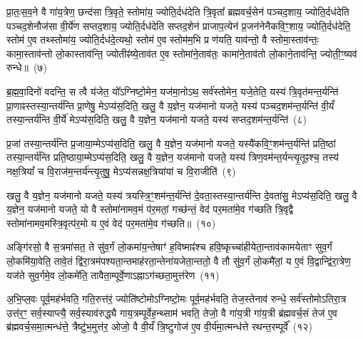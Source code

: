 {\anuvakamend[{अस्थू॑रि॒रोष॑धीषु ज्येष्ठय॒ज्ञ इति॑ बृ॒हद॑नु॒ष्टुप्छन्दः॒ प्रति॑ष्ठिता॒ नव॑ च}]}%

प्रा॒तः॒स॒व॒ने वै गा॑य॒त्रेण॒ छन्द॑सा त्रि॒वृते॒ स्तोमा॑य॒ ज्योति॒र्दध॑देति त्रि॒वृता᳚ ब्रह्मवर्च॒सेन॑ पञ्चद॒शाय॒ ज्योति॒र्दध॑देति पञ्चद॒शेनौज॑सा वी॒र्ये॑ण सप्तद॒शाय॒ ज्योति॒र्दध॑देति सप्तद॒शेन॑ प्राजाप॒त्येन॑ प्र॒जन॑नेनैकवि॒ꣳ॒शाय॒ ज्योति॒र्दध॑देति॒ स्तोम॑ ए॒व तथ्स्तोमा॑य॒ ज्योति॒र्दध॑दे॒त्यथो॒ स्तोम॑ ए॒व स्तोम॑म॒भि प्र ण॑यति॒ याव॑न्तो॒ वै स्तोमा॒स्ताव॑न्तः॒ कामा॒स्ताव॑न्तो लो॒कास्ताव॑न्ति॒ ज्योतीꣴ॑ष्ये॒ताव॑त ए॒व स्तोमा॑ने॒ताव॑तः॒ कामा॑ने॒ताव॑तो लो॒काने॒ताव॑न्ति॒ ज्योती॒ꣳ॒ष्यव॑ रुन्धे॥~(७)

{\anuvakamend[{ताव॑न्तो लो॒कास्त्रयो॑दश च}]}%

ब्र॒ह्म॒वा॒दिनो॑ वदन्ति॒ स त्वै य॑जेत॒ यो᳚\-ऽग्निष्टो॒मेन॒ यज॑मा॒नो\-ऽथ॒ सर्व॑स्तोमेन॒ यजे॒तेति॒ यस्य॑ त्रि॒वृत॑मन्त॒र्यन्ति॑ प्रा॒णाꣴस्तस्या॒न्तर्य॑न्ति प्रा॒णेषु॒ मे\-ऽप्य॑स॒दिति॒ खलु॒ वै य॒ज्ञेन॒ यज॑मानो यजते॒ यस्य॑ पञ्चद॒शम॑न्त॒र्यन्ति॑ वी॒र्यं॑ तस्या॒न्तर्य॑न्ति वी॒र्ये॑ मे\-ऽप्य॑स॒दिति॒ खलु॒ वै य॒ज्ञेन॒ यज॑मानो यजते॒ यस्य॑ सप्तद॒शम॑न्त॒र्यन्ति॑~(८)

प्र॒जां तस्या॒न्तर्य॑न्ति प्र॒जाया॒म्मे\-ऽप्य॑स॒दिति॒ खलु॒ वै य॒ज्ञेन॒ यज॑मानो यजते॒ यस्यै॑कवि॒ꣳ॒शम॑न्त॒र्यन्ति॑ प्रति॒ष्ठां तस्या॒न्तर्य॑न्ति प्रति॒ष्ठाया॒म्मे\-ऽप्य॑स॒दिति॒ खलु॒ वै य॒ज्ञेन॒ यज॑मानो यजते॒ यस्य॑ त्रिण॒वम॑न्त॒र्यन्त्यृ॒तूꣴश्च॒ तस्य॑ नक्ष॒त्रियां᳚ च वि॒राज॑म॒न्तर्य॑न्त्यृ॒तुषु॒ मे\-ऽप्य॑सन्नक्ष॒त्रिया॑यां च वि॒राजीति॑~(९)

खलु॒ वै य॒ज्ञेन॒ यज॑मानो यजते॒ यस्य॑ त्रयस्त्रि॒ꣳ॒शम॑न्त॒र्यन्ति॑ दे॒वता॒स्तस्या॒न्तर्य॑न्ति दे॒वता॑सु॒ मे\-ऽप्य॑स॒दिति॒ खलु॒ वै य॒ज्ञेन॒ यज॑मानो यजते॒ यो वै स्तोमा॑नामव॒मं प॑र॒मतां॒ गच्छ॑न्तं॒ वेद॑ पर॒मता॑मे॒व ग॑च्छति त्रि॒वृद्वै स्तोमा॑नामव॒म\-स्त्रि॒वृत्प॑र॒मो य ए॒वं वेद॑ पर॒मता॑मे॒व ग॑च्छति॥~(१०)

{\anuvakamend[{स॒प्त॒द॒शम॑न्त॒र्यन्ति॑ वि॒राजीति॒ चतु॑श्चत्वारिꣳशच्च}]}%

अङ्गि॑रसो॒ वै स॒त्रमा॑सत॒ ते सु॑व॒र्गं लो॒कमा॑य॒न्तेषाꣳ॑ ह॒विष्माꣴ॑श्च हवि॒ष्कृच्चा॑हीयेता॒न्ताव॑कामयेताꣳ सुव॒र्गं लो॒कमि॑या॒वेति॒ तावे॒तं द्वि॑रा॒त्रम॑पश्यता॒न्तमाह॑रता॒न्तेना॑यजेता॒न्ततो॒ वै तौ सु॑व॒र्गं लो॒कमै॑तां॒ य ए॒वं वि॒द्वान्द्वि॑रा॒त्रेण॒ यज॑ते सुव॒र्गमे॒व लो॒कमे॑ति॒ तावैता॒म्पूर्वे॒णा\-ऽह्ना\-ऽग॑च्छता॒मुत्त॑रेण~(११)

अ॒भि॒प्ल॒वः पूर्व॒मह॑र्भवति॒ गति॒रुत्त॑रं॒ ज्योति॑ष्टोमो\-ऽग्निष्टो॒मः पूर्व॒मह॑र्भवति॒ तेज॒स्तेनाव॑ रुन्धे॒ सर्व॑स्तोमो\-ऽतिरा॒त्र उत्त॑र॒ꣳ॒ सर्व॒स्याप्त्यै॒ सर्व॒स्याव॑रुद्ध्यै गाय॒त्रम्पूर्वेह॒न्थ्साम॑ भवति॒ तेजो॒ वै गा॑य॒त्री गा॑य॒त्री ब्र॑ह्मवर्च॒सं तेज॑ ए॒व ब्र॑ह्मवर्च॒स\-मा॒त्मन्ध॑त्ते॒ त्रैष्टु॑भ॒मुत्त॑र॒ ओजो॒ वै वी॒र्यं॑ त्रि॒ष्टुगोज॑ ए॒व वी॒र्य॑मा॒त्मन्ध॑त्ते रथन्त॒रम्पूर्वे᳚~(१२)

